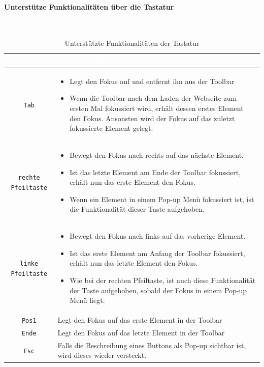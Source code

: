 \paragraph{Unterstütze Funktionalitäten über die Tastatur}
~\begin{table}[H]
	\begin{center}
	\begin{tabular}{| c | m{10cm} |}
		\hline
 		\cellcolor{Gray}\textcolor{White}{Taste} & \cellcolor{Gray}\textcolor{White}{Funktionalität}  \\
		\hline
		\texttt{Tab} &
		\begin{itemize}
			\item Legt den Fokus auf und entfernt ihn aus der Toolbar
			\item Wenn die Toolbar nach dem Laden der Webseite zum ersten Mal fokussiert wird, erhält dessen 
				erstes Element den Fokus. Ansonsten wird der Fokus auf das zuletzt fokussierte Element gelegt.
		\end{itemize} \\
		\hline
		\texttt{rechte Pfeiltaste} &
		\begin{itemize}
			\item Bewegt den Fokus nach rechts auf das nächste Element.
			\item Ist das letzte Element am Ende der Toolbar fokussiert, erhält nun das erste Element den Fokus.
			\item Wenn ein Element in einem Pop-up Menü fokussiert ist, ist die Funktionalität dieser Taste 
				aufgehoben.
		\end{itemize} \\
		\hline
		\texttt{linke Pfeiltaste} &
		\begin{itemize}
			\item Bewegt den Fokus nach links auf das vorherige Element.
			\item Ist das erste Element am Anfang der Toolbar fokussiert, erhält nun das letzte Element den 
				Fokus.
			\item Wie bei der rechten Pfeiltaste, ist auch diese Funktionalität der Taste aufgehoben, sobald der
				Fokus in einem Pop-up Menü liegt.
		\end{itemize} \\
		\hline
		\texttt{Pos1} & Legt den Fokus auf das erste Element in der Toolbar \\
		\hline
		\texttt{Ende} & Legt den Fokus auf das letzte Element in der Toolbar \\
		\hline
		\texttt{Esc} & Falls die Beschreibung eines Buttons als Pop-up sichtbar ist, wird dieses wieder versteckt. \\
		\hline
	\end{tabular}
	\end{center}
	\caption{Unterstützte Funktionalitäten der Tastatur}
\end{table}

